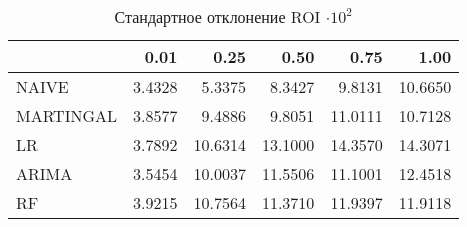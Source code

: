 \begin{table}[H]
\caption{Стандартное отклонение ROI $\cdot 10^2$}
\label{tab:roi_std}
\begin{tabular}{lrrrrr}
\toprule
 &  0.01 &  0.25 &  0.50 &  0.75 &  1.00 \\
\midrule
NAIVE & 3.4328 & 5.3375 & 8.3427 & 9.8131 & 10.6650 \\
MARTINGAL & 3.8577 & 9.4886 & 9.8051 & 11.0111 & 10.7128 \\
LR & 3.7892 & 10.6314 & 13.1000 & 14.3570 & 14.3071 \\
ARIMA & 3.5454 & 10.0037 & 11.5506 & 11.1001 & 12.4518 \\
RF & 3.9215 & 10.7564 & 11.3710 & 11.9397 & 11.9118 \\
\bottomrule
\end{tabular}
\end{table}
